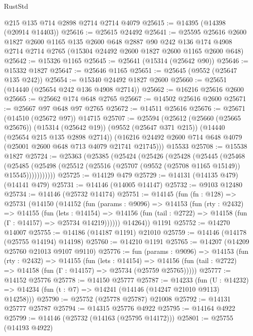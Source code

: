 \begin{lexlean}{RustStd}
\begin{coremodule}
    @215
    @135
    @714
    @2898
    @2714
    @2714
    @4079
@25615 := @14395 (@14398 (@20914 @14403))
@25616 := @25615 @24492
@25641 := @25595
    @25616
    @2600
    @1827
    @2600
    @1165
    @135
    @2600
    @648
    @2887
    @90
    @242
    @136
    @174
    @4908
    @2714
    @2714
    @2765
    (@15304 @24492 @2600 @1827 @2600 @1165 @2600 @648)
@25642 := @15326 @1165
@25645 := @25641 (@15314 (@25642 @90))
@25646 := @15332 @1827
@25647 := @25646 @1165
@25651 := @25645 (@9552 (@25647 @135 @242))
@25654 := @15340 @24492 @1827 @2600
@25660 := @25651 (@14440 (@25654 @242 @136 @4908 @2714))
@25662 := @16216 @25616 @2600
@25665 := @25662 @174 @648 @2765
@25667 := @14502 @25616 @2600
@25671 := @25667 @97 @648 @97 @2765
@25672 := @14511 @25616
@25676 := @25671 (@14510 (@25672 @97)) @14715
@25707 := @25594
    (@25612
      (@25660 (@25665 @25676))
      (@15314 (@25642 @19))
      (@9552 (@25647 @371 @215))
      (@14440 (@25654 @215 @135 @2898 @2714))
      (@16216 @24492 @2600 @714 @648 @4079 (@25001 @2600 @648 @713 @4079 @21741 @21745)))
    @15533
@25708 := @15538 @1827
@25724 := @25363
    (@25385
      (@25424
        (@25426
          (@25428
            (@25445
              (@25468
                (@25485
                  (@25498 (@25512 (@25516 (@25707 (@9552 (@25708 @1165 @15149)) @15545)))))))))))
@25725 := @14129 @479
@25729 := @14131 (@14135 @479) (@14141 @479)
@25731 := @14146 (@14005 @14147)
@25732 := @9103 @12480
@25734 := @14146 (@25732 @14174)
@25751 := @14145
    (fun (fn : @128) =>
    @25731
      (@14150
        (@14152
          (fun (params : @9096) =>
          @14153
            (fun (rty : @2432) =>
            @14155
              (fun (lets : @14154) =>
              @14156 (fun (tail : @2722) => @14158 (fun (Γ : @14157) => @25734 @14219))))))
        @14264))
    @1191
@25752 := @14270 @14007
@25755 := @14186 (@14187 @1191) @21010
@25759 := @14146 (@14178 (@25755 @14194) @14198)
@25760 := @14210 @1191
@25765 := @14207 (@14209 @25760 @21013 @9107 @9110)
@25776 := fun (params : @9096) =>
  @14153
    (fun (rty : @2432) =>
    @14155
      (fun (lets : @14154) =>
      @14156 (fun (tail : @2722) => @14158 (fun (Γ : @14157) => @25734 (@25759 @25765)))))
@25777 := @14152 @25776
@25778 := @14150 @25777
@25787 := @14233
    (fun (U : @14232) => @14234 (fun (t : @7) => @14241 (@14146 (@14247 @21010 @9113) @14258)))
@25790 := @25752 (@25778 @25787) @21008
@25792 := @14131 @25777 @25787
@25794 := @14315 @25776 @4922
@25795 := @14164 @4922
@25799 := @14146 (@25732 (@14163 (@25795 @14172)))
@25801 := @25755 (@14193 @4922)

\end{coremodule}
\end{lexlean}
